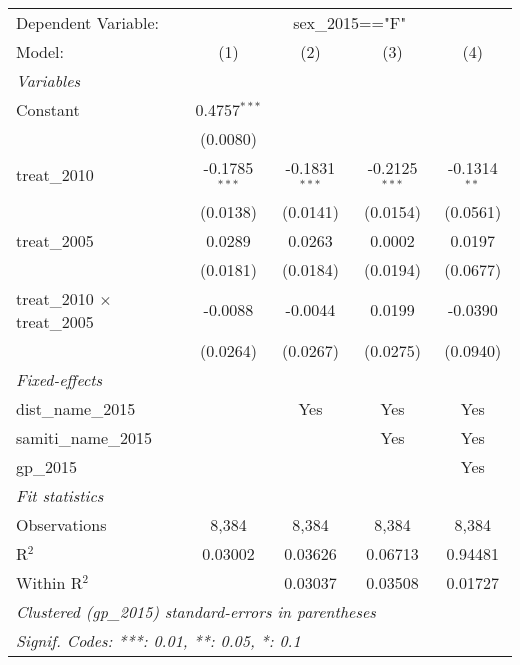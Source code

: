 
\begingroup
\centering
\begin{tabular}{lcccc}
   \tabularnewline \midrule \midrule
   Dependent Variable: & \multicolumn{4}{c}{sex\_2015=="F"}\\
   Model:                              & (1)             & (2)             & (3)             & (4)\\  
   \midrule
   \emph{Variables}\\
   Constant                            & 0.4757$^{***}$  &                 &                 &   \\   
                                       & (0.0080)        &                 &                 &   \\   
   treat\_2010                         & -0.1785$^{***}$ & -0.1831$^{***}$ & -0.2125$^{***}$ & -0.1314$^{**}$\\   
                                       & (0.0138)        & (0.0141)        & (0.0154)        & (0.0561)\\   
   treat\_2005                         & 0.0289          & 0.0263          & 0.0002          & 0.0197\\   
                                       & (0.0181)        & (0.0184)        & (0.0194)        & (0.0677)\\   
   treat\_2010 $\times$ treat\_2005    & -0.0088         & -0.0044         & 0.0199          & -0.0390\\   
                                       & (0.0264)        & (0.0267)        & (0.0275)        & (0.0940)\\   
   \midrule
   \emph{Fixed-effects}\\
   dist\_name\_2015                    &                 & Yes             & Yes             & Yes\\  
   samiti\_name\_2015                  &                 &                 & Yes             & Yes\\  
   gp\_2015                            &                 &                 &                 & Yes\\  
   \midrule
   \emph{Fit statistics}\\
   Observations                        & 8,384           & 8,384           & 8,384           & 8,384\\  
   R$^2$                               & 0.03002         & 0.03626         & 0.06713         & 0.94481\\  
   Within R$^2$                        &                 & 0.03037         & 0.03508         & 0.01727\\  
   \midrule \midrule
   \multicolumn{5}{l}{\emph{Clustered (gp\_2015) standard-errors in parentheses}}\\
   \multicolumn{5}{l}{\emph{Signif. Codes: ***: 0.01, **: 0.05, *: 0.1}}\\
\end{tabular}
\par\endgroup



